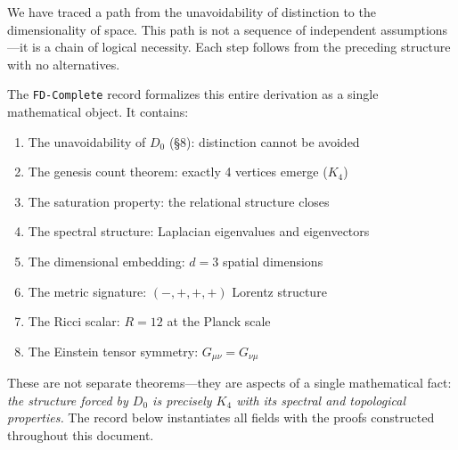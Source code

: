 \documentclass[11pt,a4paper]{book}
\begin{document}
We have traced a path from the unavoidability of distinction to the dimensionality of space. 
This path is not a sequence of independent assumptions—it is a chain of logical necessity. 
Each step follows from the preceding structure with no alternatives.

The \texttt{FD-Complete} record formalizes this entire derivation as a single mathematical 
object. It contains:
\begin{enumerate}
\item The unavoidability of $D_0$ (§8): distinction cannot be avoided
\item The genesis count theorem: exactly 4 vertices emerge ($K_4$)
\item The saturation property: the relational structure closes
\item The spectral structure: Laplacian eigenvalues and eigenvectors
\item The dimensional embedding: $d=3$ spatial dimensions
\item The metric signature: $(-, +, +, +)$ Lorentz structure
\item The Ricci scalar: $R = 12$ at the Planck scale
\item The Einstein tensor symmetry: $G_{\mu\nu} = G_{\nu\mu}$
\end{enumerate}

These are not separate theorems—they are aspects of a single mathematical fact: 
\emph{the structure forced by $D_0$ is precisely $K_4$ with its spectral and topological 
properties.} The record below instantiates all fields with the proofs constructed throughout 
this document.
\end{document}
